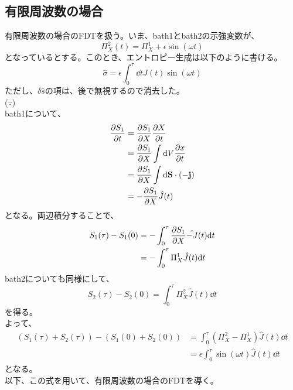 \documentclass[a4paper,11pt]{jsarticle}
\begin{document}
\subsection{有限周波数の場合}
有限周波数の場合のFDTを扱う。いま、bath1とbath2の示強変数が、
\begin{equation}
    \Pi_X ^2 (t) = \Pi_X ^1 + \epsilon \sin(\omega t)
\end{equation}
となっているとする。このとき、エントロピー生成は以下のように書ける。
\begin{equation}
    \hat{\sigma} = \epsilon \int_{0}^{\tau} \dd t \hat{J}(t) \sin(\omega t)
\end{equation}
ただし、$\delta \hat{s}$の項は、後で無視するので消去した。\\
($\because$)\\
bath1について、
\begin{align}
    \pdv{S_1}{t} &= \pdv{S_1}{X} \pdv{X}{t}\\
    &= \pdv{S_1}{X} \int \dd V \pdv{x}{t}\\
    &= \pdv{S_1}{X} \int \dd \vb{S} \cdot (\vb{-j})\\
    &= -\pdv{S_1}{X}  \hat{J}(t)\\
\end{align}
となる。両辺積分することで、
\begin{align}
    S_1(\tau) - S_1(0) &= -\int_{0}^{\tau}  \pdv{S_1}{X} \hat{-J}(t)\dd t\\
    &= -\int_{0}^{\tau}  \Pi_X ^1 \hat{J}(t) \dd t
\end{align}
bath2についても同様にして、
\begin{equation}
    S_2(\tau) - S_2(0) = \int_{0}^{\tau}  \Pi_X ^2 \hat{J}(t) \dd t
\end{equation}
を得る。\\
よって、
\begin{align}
    (S_1(\tau) + S_2(\tau)) - (S_1(0) + S_2(0)) &= \int_{0}^{\tau}  (\Pi_X ^2 - \Pi_X ^1) \hat{J}(t) \dd t\\
    &= \epsilon \int_{0}^{\tau}  \sin(\omega t) \hat{J}(t) \dd t
\end{align}
となる。\hfill \qedsymbol
\\
以下、この式を用いて、有限周波数の場合のFDTを導く。\\
\end{document}
